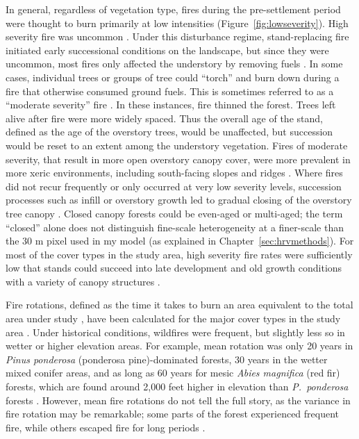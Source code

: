 In general, regardless of vegetation type, fires during the pre-settlement period were thought to burn primarily at low intensities (Figure~\ref{fig:lowseverity}). High severity fire was uncommon \citep{Skinner1996, SNEP1996a,Mallek2013,Stephens2015}. Under this disturbance regime, stand-replacing fire initiated early successional conditions on the landscape, but since they were uncommon, most fires only affected the understory by removing fuels \citep{Skinner1996, SNEP1996a,Mallek2013}. In some cases, individual trees or groups of tree could ``torch'' and burn down during a fire that otherwise consumed ground fuels. This is sometimes referred to as a ``moderate severity'' fire \citep{Beaty2001}. In these instances, fire thinned the forest. Trees left alive after fire were more widely spaced. Thus the overall age of the stand, defined as the age of the overstory trees, would be unaffected, but succession would be reset to an extent among the understory vegetation. Fires of moderate severity, that result in more open overstory canopy cover, were more prevalent in more xeric environments, including south-facing slopes and ridges \citep{SNEP1996a,SNEP1996,Mallek2013,Safford2014}. Where fires did not recur frequently or only occurred at very low severity levels, succession processes such as infill or overstory growth led to gradual closing of the overstory tree canopy \citep{SNEP1996a,McKenzie2004}. Closed canopy forests could be even-aged or multi-aged; the term ``closed'' alone does not distinguish fine-scale heterogeneity at a finer-scale than the 30 m pixel used in my model (as explained in Chapter~\ref{sec:hrvmethods}). For most of the cover types in the study area, high severity fire rates were sufficiently low that stands could succeed into late development and old growth conditions with a variety of canopy structures \citep{SNEP1996a,SNEP1996,Mallek2013,Safford2014}. 


Fire rotations, defined as the time it takes to burn an area equivalent to the total area under study \citep{Agee1993}, have been calculated for the major cover types in the study area \citep{Mallek2013}. Under historical conditions, wildfires were frequent, but slightly less so in wetter or higher elevation areas. For example, mean rotation was only 20 years in \emph{Pinus ponderosa} (ponderosa pine)-dominated forests, 30 years in the wetter mixed conifer areas, and as long as 60 years for mesic \emph{Abies magnifica} (red fir) forests, which are found around 2,000 feet higher in elevation than \emph{P.~ponderosa} forests \citep{Mallek2013}. However, mean fire rotations do not tell the full story, as the variance in fire rotation may be remarkable; some parts of the forest experienced frequent fire, while others escaped fire for long periods \citep{Mallek2013}.



